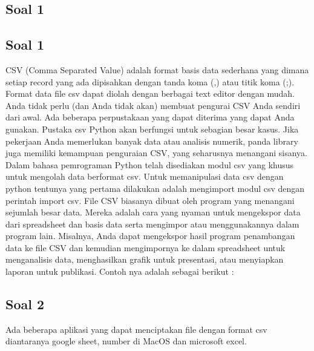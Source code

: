 \subsection{Soal 1}
\begin{enumerate}
\subsection{Soal 1}
 CSV (Comma Separated Value) adalah format basis data sederhana yang dimana setiap record yang ada dipisahkan dengan tanda koma (,) atau titik koma (;). Format data file csv dapat diolah dengan berbagai text editor dengan mudah. Anda tidak perlu (dan Anda tidak akan) membuat pengurai CSV Anda sendiri dari awal. Ada beberapa perpustakaan yang dapat diterima yang dapat Anda gunakan. Pustaka csv Python akan berfungsi untuk sebagian besar kasus. Jika pekerjaan Anda memerlukan banyak data atau analisis numerik, panda library juga memiliki kemampuan penguraian CSV, yang seharusnya menangani sisanya. Dalam bahasa pemrograman Python telah disediakan modul csv yang khusus untuk mengolah data berformat csv.  Untuk memanipulasi data csv dengan python tentunya yang pertama dilakukan adalah mengimport modul csv dengan perintah import csv. File CSV biasanya dibuat oleh program yang menangani sejumlah besar data. Mereka adalah cara yang nyaman untuk mengekspor data dari spreadsheet dan basis data serta mengimpor atau menggunakannya dalam program lain. Misalnya, Anda dapat mengekspor hasil program penambangan data ke file CSV dan kemudian mengimpornya ke dalam spreadsheet untuk menganalisis data, menghasilkan grafik untuk presentasi, atau menyiapkan laporan untuk publikasi. Contoh nya adalah sebagai berikut :

 

\subsection{Soal 2} 
 Ada beberapa aplikasi yang dapat menciptakan file dengan format csv diantaranya google sheet, number di MacOS dan microsoft excel.


\end{enumerate}
